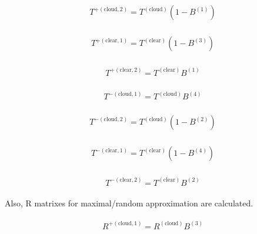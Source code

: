 \begin{eqnarray}
\begin{array}{l}
T^{+(\text {cloud}, 2)}=T^{(\text {cloud})}\left(1-B^{(1)}\right)
\end{array}
\end{eqnarray}

\begin{eqnarray}
\begin{array}{l}
T^{+(\text {clear}, 1)}=T^{(\text {clear})}\left(1-B^{(3)}\right)
\end{array}
\end{eqnarray}

\begin{eqnarray}
\begin{array}{l}
T^{+(\text {clear}, 2)}=T^{(\text {clear})} B^{(1)}
\end{array}
\end{eqnarray}

\begin{eqnarray}
\begin{array}{l}
T^{-(\text {cloud}, 1)}=T^{(\text {cloud})} B^{(4)}
\end{array}
\end{eqnarray}

\begin{eqnarray}
\begin{array}{l}
T^{-(\text {cloud}, 2)}=T^{(\text {cloud})}\left(1-B^{(2)}\right)
\end{array}
\end{eqnarray}

\begin{eqnarray}
\begin{array}{l}
T^{-(\text {clear}, 1)}=T^{(\text {clear})}\left(1-B^{(4)}\right)
\end{array}
\end{eqnarray}

\begin{eqnarray}
\begin{array}{l}
T^{-(\text {clear}, 2)}=T^{(\text {clear})} B^{(2)}
\end{array}
\end{eqnarray}

Also, R matrixes for maximal/random approximation are calculated.

\begin{eqnarray}
\begin{array}{l}
R^{+(\text {cloud}, 1)}=R^{(\text {cloud})} B^{(3)}
\end{array}
\end{eqnarray}

